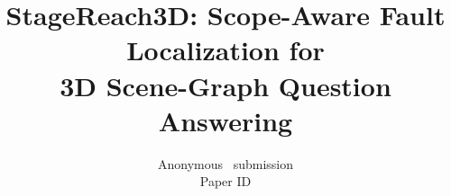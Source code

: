 \documentclass[10pt,twocolumn,letterpaper]{article}
\title{StageReach3D: Scope-Aware Fault Localization for\\
3D Scene-Graph Question Answering}
\author{Anonymous \confName~submission\\
Paper ID \paperID}
\begin{document}
\maketitle









{
    \small
    
    
}
\end{document}
